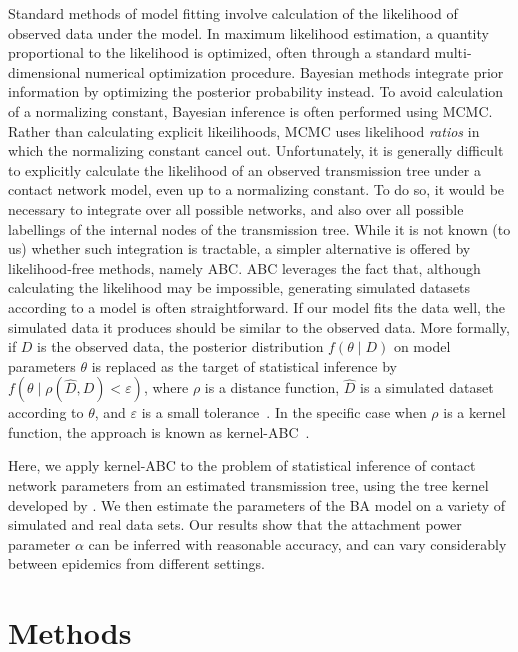 \documentclass[12pt]{article}\usepackage[]{graphicx}\usepackage[]{color}
\begin{document}
Standard methods of model fitting involve calculation of the likelihood of
observed data under the model. In maximum likelihood estimation, a quantity
proportional to the likelihood is optimized, often through a standard
multi-dimensional numerical optimization procedure. Bayesian methods integrate
prior information by optimizing the posterior probability instead. To avoid
calculation of a normalizing constant, Bayesian inference is often performed
using \gls{MCMC}. Rather than calculating explicit likeilihoods, \gls{MCMC}
uses likelihood \emph{ratios} in which the normalizing constant cancel out.
Unfortunately, it is generally difficult to explicitly calculate the likelihood
of an observed transmission tree under a contact network model, even up to a
normalizing constant. To do so, it would be necessary to integrate over all
possible networks, and also over all possible labellings of the internal nodes
of the transmission tree. While it is not known (to us) whether such
integration is tractable, a simpler alternative is offered by likelihood-free
methods, namely \gls{ABC}. \gls{ABC} leverages the fact that, although
calculating the likelihood may be impossible, generating simulated datasets
according to a model is often straightforward. If our model fits the data well,
the simulated data it produces should be similar to the observed data. More
formally, if $D$ is the observed data, the posterior distribution $f(\theta
\mid D)$ on model parameters $\theta$ is replaced as the target of statistical
inference by $f(\theta \mid \rho(\hat{D}, D) < \varepsilon)$, where $\rho$ is a
distance function, $\hat{D}$ is a simulated dataset according to $\theta$, and
$\varepsilon$ is a small tolerance~\autocite{sunnaker2013approximate}. In the
specific case when $\rho$ is a kernel function, the approach is known as
kernel-\gls{ABC}~\autocite{nakagome2013kernel, poon2015phylodynamic}.

Here, we apply kernel-\gls{ABC} to the problem of statistical inference of
contact network parameters from an estimated transmission tree, using the tree
kernel developed by \textcite{poon2013mapping}. We then estimate the parameters
of the \gls{BA} model on a variety of simulated and real data sets. Our results
show that the attachment power parameter $\alpha$ can be inferred with
reasonable accuracy, and can vary considerably between epidemics from different
settings.

\section*{Methods}
\end{document}
